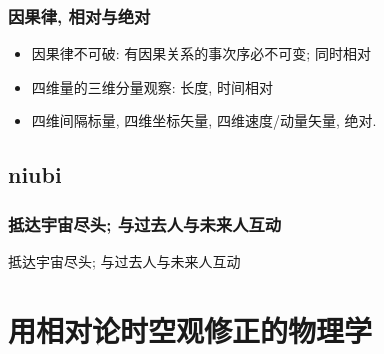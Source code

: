 \documentclass[aspectratio=169, 10pt, utf8, mathserif]{beamer}
\def\hilite<#1>{\temporal<#1>{\color{blue!80}}{\color{blue!85!white}}{\color{black}}}%
\numberwithin{equation}{section} %
\numberwithin{figure}{section} %
\begin{document}
\begin{frame}
\frametitle{\textsc{因果律, 相对与绝对}}
\begin{itemize}
\hilite<1>\item 因果律不可破: 有因果关系的事次序必不可变; 同时相对\pause
\hilite<2>\item 四维量的三维分量观察: 长度, 时间相对\pause
\hilite<3>\item 四维间隔标量, 四维坐标矢量, 四维速度/动量矢量, 绝对.
\end{itemize}
\end{frame}




\subsection[抵达宇宙尽头; 与过去人与未来人互动]{niubi}\label{subsec:3-3}

\begin{frame}
\frametitle{\textsc{抵达宇宙尽头; 与过去人与未来人互动}}
抵达宇宙尽头; 与过去人与未来人互动

\end{frame}


\section[用相对论时空观修正的物理学]{用相对论时空观修正的物理学}

\end{document}
